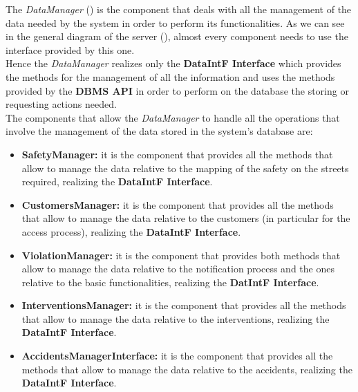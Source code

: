 			The \emph{DataManager} () is the component that deals with all the management of the data needed by the system in order to perform its functionalities. As we can see in the general diagram of the server (), almost every component needs to use the interface provided by this one.\\
			
			Hence the \emph{DataManager} realizes only the \textbf{DataIntF Interface} which provides the methods for the management of all the information and uses the methods provided by the \textbf{DBMS API} in order to perform on the database the storing or requesting actions needed.\\
			
			The components that allow the \emph{DataManager} to handle all the operations that involve the management of the data stored in the system's database are:
			
			\begin{itemize}
				\item \textbf{SafetyManager:} it is the component that provides all the methods that allow to manage the data relative to the mapping of the safety on the streets required, realizing the \textbf{DataIntF Interface}.
				
				\item \textbf{CustomersManager:} it is the component that provides all the methods that allow to manage the data relative to the customers (in particular for the access process), realizing the \textbf{DataIntF Interface}. 
				
				\item \textbf{ViolationManager:} it is the component that provides both methods that allow to manage the data relative to the notification process and the ones relative to the basic functionalities, realizing the \textbf{DatIntF Interface}.
				
				\item \textbf{InterventionsManager:} it is the component that provides all the methods that allow to manage the data relative to the interventions, realizing the \textbf{DataIntF Interface}.
				
				\item \textbf{AccidentsManagerInterface:} it is the component that provides all the methods that allow to manage the data relative to the accidents, realizing the \textbf{DataIntF Interface}.
			\end{itemize}
		
